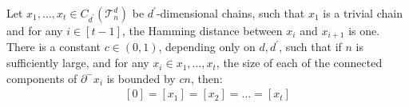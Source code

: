 \begin{claim}
  \label{claim:barrier}
Let $x_{1}, \ldots, x_{t} \in C_{d^{\prime}}(\mathcal{T}_n^d)$ be $d^{\prime}$-dimensional chains, such that $x_{1}$ is a trivial chain and for any $i \in [t-1]$, the Hamming distance between $x_{i}$ and $x_{i+1}$ is one. There is a constant $c \in (0,1)$, depending only on $d, d^{\prime}$, such that if $n$ is sufficiently large, and for any $x_{i} \in x_{1}, \ldots, x_{t}$, the size of each of the connected components of $\partial^{-} x_{i}$ is bounded by $c n$, then:
  \begin{equation*}
    \begin{split}
      [0]= [x_{1}] = [x_{2}] = ... = [x_{t}] 
    \end{split}
  \end{equation*}
\end{claim}
